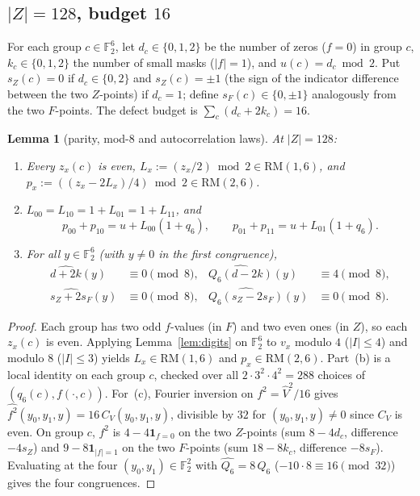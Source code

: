 \documentclass[11pt]{article}
\newtheorem{lemma}[theorem]{Lemma}
\theoremstyle{definition}
\theoremstyle{remark}
\newcommand{\F}{\mathbb{F}}
\newcommand{\ind}{\mathbf{1}}
\newcommand{\RM}{\mathrm{RM}}
\DeclareRobustCommand{\_}{\textunderscore\allowbreak}
\begin{document}
\subsection{$|Z|=128$, budget $16$}\label{sec:z128}

For each group $c\in\F_2^6$, let $d_c\in\{0,1,2\}$ be the number of zeros ($f=0$) in group $c$, $k_c\in\{0,1,2\}$ the number of small masks ($|f|=1$), and $u(c)=d_c\bmod2$. Put $s_Z(c)=0$ if $d_c\in\{0,2\}$ and $s_Z(c)=\pm1$ (the sign of the indicator difference between the two $Z$-points) if $d_c=1$; define $s_F(c)\in\{0,\pm1\}$ analogously from the two $F$-points. The defect budget is $\sum_c(d_c+2k_c)=16$.

\begin{lemma}[parity, mod-$8$ and autocorrelation laws]\label{lem:z128-laws}
At $|Z|=128$:
\begin{enumerate}[label=(\alph*),nosep]
\item Every $z_x(c)$ is even, $L_x:=(z_x/2)\bmod2\in\RM(1,6)$, and $p_x:=((z_x-2L_x)/4)\bmod2\in\RM(2,6)$.
\item $L_{00}=L_{10}=1+L_{01}=1+L_{11}$, and
\[
  p_{00}+p_{10}=u+L_{00}(1+q_6),\qquad p_{01}+p_{11}=u+L_{01}(1+q_6).
\]
\item For all $y\in\F_2^6$ (with $y\neq0$ in the first congruence),
\begin{align*}
  \widehat{d+2k}(y)&\equiv0\pmod 8, &
  \widehat{Q_6(d-2k)}(y)&\equiv4\pmod 8,\\
  \widehat{s_Z+2s_F}(y)&\equiv0\pmod 8, &
  \widehat{Q_6(s_Z-2s_F)}(y)&\equiv0\pmod 8.
\end{align*}
\end{enumerate}
\end{lemma}

\begin{proof}
Each group has two odd $f$-values (in $F$) and two even ones (in $Z$), so each $z_x(c)$ is even. Applying Lemma~\ref{lem:digits} on $\F_2^6$ to $v_x$ modulo $4$ ($|I|\le4$) and modulo $8$ ($|I|\le3$) yields $L_x\in\RM(1,6)$ and $p_x\in\RM(2,6)$. Part~(b) is a local identity on each group $c$, checked over all $2\cdot3^2\cdot4^2=288$ choices of $(q_6(c),f(\cdot,c))$. For~(c), Fourier inversion on $f^2=\widehat V^2/16$ gives $\widehat{f^2}(y_0,y_1,y)=16\,C_V(y_0,y_1,y)$, divisible by $32$ for $(y_0,y_1,y)\neq0$ since $C_V$ is even. On group $c$, $f^2$ is $4-4\ind_{f=0}$ on the two $Z$-points (sum $8-4d_c$, difference $-4s_Z$) and $9-8\ind_{|f|=1}$ on the two $F$-points (sum $18-8k_c$, difference $-8s_F$). Evaluating at the four $(y_0,y_1)\in\F_2^2$ with $\widehat{Q_6}=8\,Q_6$ ($-10\cdot8\equiv16\pmod{32}$) gives the four congruences.
\end{proof}
\end{document}
